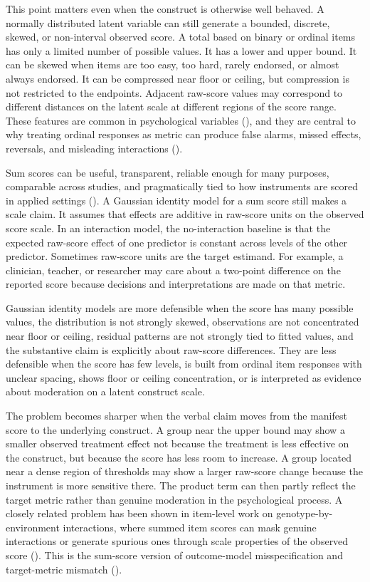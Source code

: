 \documentclass[
  man,
  longtable,
  nolmodern,
  notxfonts,
  notimes,
  colorlinks=true,linkcolor=blue,citecolor=blue,urlcolor=blue]{apa7}
\begin{document}
This point matters even when the construct is otherwise well behaved. A
normally distributed latent variable can still generate a bounded,
discrete, skewed, or non-interval observed score. A total based on
binary or ordinal items has only a limited number of possible values. It
has a lower and upper bound. It can be skewed when items are too easy,
too hard, rarely endorsed, or almost always endorsed. It can be
compressed near floor or ceiling, but compression is not restricted to
the endpoints. Adjacent raw-score values may correspond to different
distances on the latent scale at different regions of the score range.
These features are common in psychological variables
(), and they are central to why
treating ordinal responses as metric can produce false alarms, missed
effects, reversals, and misleading interactions
().

Sum scores can be useful, transparent, reliable enough for many
purposes, comparable across studies, and pragmatically tied to how
instruments are scored in applied settings
(). A Gaussian
identity model for a sum score still makes a scale claim. It assumes
that effects are additive in raw-score units on the observed score
scale. In an interaction model, the no-interaction baseline is that the
expected raw-score effect of one predictor is constant across levels of
the other predictor. Sometimes raw-score units are the target estimand.
For example, a clinician, teacher, or researcher may care about a
two-point difference on the reported score because decisions and
interpretations are made on that metric.

Gaussian identity models are more defensible when the score has many
possible values, the distribution is not strongly skewed, observations
are not concentrated near floor or ceiling, residual patterns are not
strongly tied to fitted values, and the substantive claim is explicitly
about raw-score differences. They are less defensible when the score has
few levels, is built from ordinal item responses with unclear spacing,
shows floor or ceiling concentration, or is interpreted as evidence
about moderation on a latent construct scale.

The problem becomes sharper when the verbal claim moves from the
manifest score to the underlying construct. A group near the upper bound
may show a smaller observed treatment effect not because the treatment
is less effective on the construct, but because the score has less room
to increase. A group located near a dense region of thresholds may show
a larger raw-score change because the instrument is more sensitive
there. The product term can then partly reflect the target metric rather
than genuine moderation in the psychological process. A closely related
problem has been shown in item-level work on genotype-by-environment
interactions, where summed item scores can mask genuine interactions or
generate spurious ones through scale properties of the observed score
(). This is the
sum-score version of outcome-model misspecification and target-metric
mismatch ().
\end{document}
